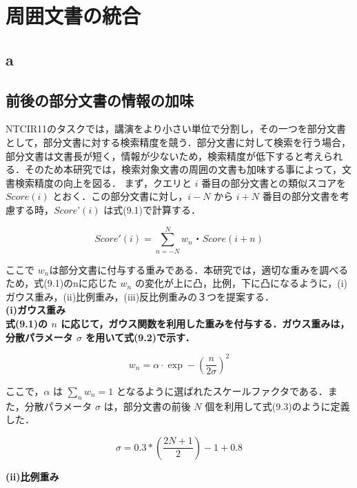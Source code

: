 \chapter{周囲文書の統合}

\section{a}


\section{前後の部分文書の情報の加味}
NTCIR11のタスクでは，講演をより小さい単位で分割し，その一つを部分文書として，部分文書に対する検索精度を競う．部分文書に対して検索を行う場合，部分文書は文書長が短く，情報が少ないため，検索精度が低下すると考えられる．そのため本研究では，検索対象文書の周囲の文書も加味する事によって，文書検索精度の向上を図る．
まず，クエリと $i$ 番目の部分文書との類似スコアを $Score(i)$ とおく．この部分文書に対し，$i-N$ から $i+N$ 番目の部分文書を考慮する時，$ Score’(i)$ は式(9.1)で計算する．

\begin{equation}
    Score'(i) = \sum_{n=-N}^N w_n・Score(i + n) 
    \label{zengo1}
\end{equation}

ここで $w_n$は部分文書に付与する重みである．本研究では，適切な重みを調べるため，式(9.1)のnに応じた $w_n$ の変化が上に凸，比例，下に凸になるように，(i)ガウス重み，(ii)比例重み，(iii)反比例重みの３つを提案する．\\

\bf(i)ガウス重み \\

式(9.1)の $n$ に応じて，ガウス関数を利用した重みを付与する．ガウス重みは，分散パラメータ $\sigma$ を用いて式(9.2)で示す．

\begin{equation}
    w_n = \alpha⋅\exp⁡-(\frac{n}{2\sigma})^2
    \label{zengo2}
\end{equation}

ここで，$\alpha$ は $\sum_n w_n = 1$ となるように選ばれたスケールファクタである．また，分散パラメータ $\sigma$ は，部分文書の前後 $N$ 個を利用して式(9.3)のように定義した．

\begin{equation}
    \sigma = 0.3 * (\frac{2N+1}{2}) - 1 + 0.8
    \label{zengo3}
\end{equation}

\bf(ii)比例重み \\

